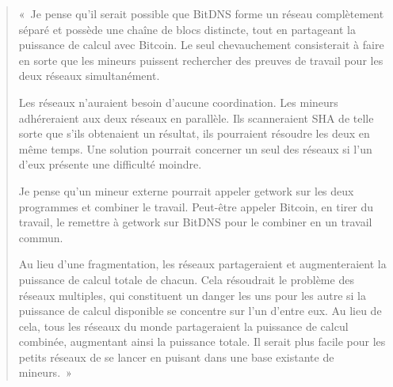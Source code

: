 \begin{quote}
«~Je pense qu'il serait possible que BitDNS forme un réseau complètement séparé et possède une chaîne de blocs distincte, tout en partageant la puissance de calcul avec Bitcoin. Le seul chevauchement consisterait à faire en sorte que les mineurs puissent rechercher des preuves de travail pour les deux réseaux simultanément.

Les réseaux n'auraient besoin d'aucune coordination. Les mineurs adhéreraient aux deux réseaux en parallèle. Ils scanneraient SHA de telle sorte que s'ils obtenaient un résultat, ils pourraient résoudre les deux en même temps. Une solution pourrait concerner un seul des réseaux si l'un d'eux présente une difficulté moindre.

Je pense qu'un mineur externe pourrait appeler getwork sur les deux programmes et combiner le travail. Peut-être appeler Bitcoin, en tirer du travail, le remettre à getwork sur BitDNS pour le combiner en un travail commun.

Au lieu d'une fragmentation, les réseaux partageraient et augmenteraient la puissance de calcul totale de chacun. Cela résoudrait le problème des réseaux multiples, qui constituent un danger les uns pour les autre si la puissance de calcul disponible se concentre sur l'un d'entre eux. Au lieu de cela, tous les réseaux du monde partageraient la puissance de calcul combinée, augmentant ainsi la puissance totale. Il serait plus facile pour les petits réseaux de se lancer en puisant dans une base existante de mineurs.~»
\end{quote}

%
%
%


